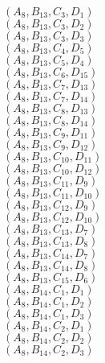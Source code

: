 \documentclass[14pt]{article}
\begin{document}
    $({A}_{8}, {B}_{13}, {C}_{3}, {D}_{1}) $ \\ 
    $({A}_{8}, {B}_{13}, {C}_{3}, {D}_{2}) $ \\ 
    $({A}_{8}, {B}_{13}, {C}_{3}, {D}_{3}) $ \\ 
    $({A}_{8}, {B}_{13}, {C}_{4}, {D}_{5}) $ \\ 
    $({A}_{8}, {B}_{13}, {C}_{5}, {D}_{4}) $ \\ 
    $({A}_{8}, {B}_{13}, {C}_{6}, {D}_{15}) $ \\ 
    $({A}_{8}, {B}_{13}, {C}_{7}, {D}_{13}) $ \\ 
    $({A}_{8}, {B}_{13}, {C}_{7}, {D}_{14}) $ \\ 
    $({A}_{8}, {B}_{13}, {C}_{8}, {D}_{13}) $ \\ 
    $({A}_{8}, {B}_{13}, {C}_{8}, {D}_{14}) $ \\ 
    $({A}_{8}, {B}_{13}, {C}_{9}, {D}_{11}) $ \\ 
    $({A}_{8}, {B}_{13}, {C}_{9}, {D}_{12}) $ \\ 
    $({A}_{8}, {B}_{13}, {C}_{10}, {D}_{11}) $ \\ 
    $({A}_{8}, {B}_{13}, {C}_{10}, {D}_{12}) $ \\ 
    $({A}_{8}, {B}_{13}, {C}_{11}, {D}_{9}) $ \\ 
    $({A}_{8}, {B}_{13}, {C}_{11}, {D}_{10}) $ \\ 
    $({A}_{8}, {B}_{13}, {C}_{12}, {D}_{9}) $ \\ 
    $({A}_{8}, {B}_{13}, {C}_{12}, {D}_{10}) $ \\ 
    $({A}_{8}, {B}_{13}, {C}_{13}, {D}_{7}) $ \\ 
    $({A}_{8}, {B}_{13}, {C}_{13}, {D}_{8}) $ \\ 
    $({A}_{8}, {B}_{13}, {C}_{14}, {D}_{7}) $ \\ 
    $({A}_{8}, {B}_{13}, {C}_{14}, {D}_{8}) $ \\ 
    $({A}_{8}, {B}_{13}, {C}_{15}, {D}_{6}) $ \\ 
    $({A}_{8}, {B}_{14}, {C}_{1}, {D}_{1}) $ \\ 
    $({A}_{8}, {B}_{14}, {C}_{1}, {D}_{2}) $ \\ 
    $({A}_{8}, {B}_{14}, {C}_{1}, {D}_{3}) $ \\ 
    $({A}_{8}, {B}_{14}, {C}_{2}, {D}_{1}) $ \\ 
    $({A}_{8}, {B}_{14}, {C}_{2}, {D}_{2}) $ \\ 
    $({A}_{8}, {B}_{14}, {C}_{2}, {D}_{3}) $ \\ 
\end{document}
